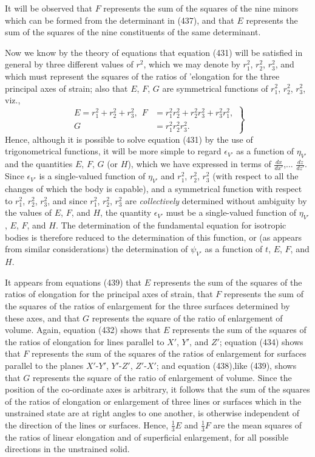 \documentclass[12pt]{article}
\begin{document}
{It will be observed that $F$ represents the sum of the squares of the nine minors which can be formed from the determinant in (437), and that $E$ represents the sum of the squares of the nine constituents of the same determinant.


Now we know by the theory of equations that equation (431) will be satisfied in general by three different values of $r^2$, which we may denote by $r_1^2$, $r_2^2$, $r_3^2$, and which must represent the squares of the ratios of 'elongation for the three principal axes of strain; also that $E$, $F$, $G$ are symmetrical functions of $r_1^2$, $r_2^2$, $r_3^2$, viz.,
\begin{equation} \left. \begin{aligned}
E=r_1^2+r_2^2+r_3^2, \ \ F&=r_1^2r_2^2+r_2^2 r_3^2 +r_3^2 r_1^2, \\
G &= r_1^2 r_2^2 r_3^2.
\end{aligned} \right\} \label{439}\end{equation}
Hence, although it is possible to solve equation (431) by the use of trigonometrical functions, it will be more simple to regard $\epsilon_{V'}$ as a function of $\eta_{V'}$ and the quantities $E$, $F$, $G$ (or $H$), which we have expressed in terms of $\frac{dx}{dx'}$,... $\frac{dz}{dz'}$. Since $\epsilon_{V'}$ is a single-valued function of $\eta_{V'}$ and $r_1^2$, $r_2^2$, $r_3^2$ (with respect to all the changes of which the body is capable), and a symmetrical function with respect to $r_1^2$, $r_2^2$, $r_3^2$, and since $r_1^2$, $r_2^2$, $r_3^2$ are \textit{collectively} determined without ambiguity by the values of $E$, $F$, and $H$, the quantity $\epsilon_{V'}$ must be a single-valued function of $\eta_{V'}$, $E$, $F$, and $H$. The determination of the fundamental equation for isotropic bodies is therefore reduced to the determination of this function, or (as appears from similar considerations) the determination of $\psi_{V'}$ as a function of $t$, $E$, $F$, and $H$.


It appears from equations (439) that $E$ represents the sum of the squares of the ratios of elongation for the principal axes of strain, that $F$ represents the sum of the squares of the ratios of enlargement for the three surfaces determined by these axes, and that $G$ represents the square of the ratio of enlargement of volume. Again, equation (432) shows that $E$ represents the sum of the squares of the ratios of elongation for lines parallel to $X'$, $Y'$, and $Z'$; equation (434) shows that $F$ represents the sum of the squares of the ratios of enlargement for surfaces parallel to the planes $X'$-$Y'$, $Y'$-$Z'$, $Z'$-$X'$; and equation (438),like (439), shows that $G$ represents the square of the ratio of enlargement of volume. Since the position of the co-ordinate axes is arbitrary, it follows that the sum of the squares of the ratios of elongation or enlargement of three lines or surfaces which in the unstrained state are at right angles to one another, is otherwise independent of the direction of the lines or surfaces. Hence, $\frac{1}{3}E$ and $\frac{1}{3}F$ are the mean squares of the ratios of linear elongation and of superficial enlargement, for all possible directions in the unstrained solid.


}
\end{document}

